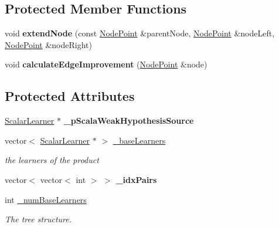 \subsection*{Protected Member Functions}
\begin{DoxyCompactItemize}
\item 
\hypertarget{classMultiBoost_1_1TreeLearner_ad763209e0f068124297f7b878209eda7}{
void {\bfseries extendNode} (const \hyperlink{structMultiBoost_1_1NodePoint}{NodePoint} \&parentNode, \hyperlink{structMultiBoost_1_1NodePoint}{NodePoint} \&nodeLeft, \hyperlink{structMultiBoost_1_1NodePoint}{NodePoint} \&nodeRight)}
\label{classMultiBoost_1_1TreeLearner_ad763209e0f068124297f7b878209eda7}

\item 
\hypertarget{classMultiBoost_1_1TreeLearner_a0971878fc92652e2f61fb5d4044c56c8}{
void {\bfseries calculateEdgeImprovement} (\hyperlink{structMultiBoost_1_1NodePoint}{NodePoint} \&node)}
\label{classMultiBoost_1_1TreeLearner_a0971878fc92652e2f61fb5d4044c56c8}

\end{DoxyCompactItemize}
\subsection*{Protected Attributes}
\begin{DoxyCompactItemize}
\item 
\hypertarget{classMultiBoost_1_1TreeLearner_a78720aad6ed0557a2233019d3e5ede49}{
\hyperlink{classMultiBoost_1_1ScalarLearner}{ScalarLearner} $\ast$ {\bfseries \_\-pScalaWeakHypothesisSource}}
\label{classMultiBoost_1_1TreeLearner_a78720aad6ed0557a2233019d3e5ede49}

\item 
\hypertarget{classMultiBoost_1_1TreeLearner_a79ec9f6c29efc369298e3f64ae62e026}{
vector$<$ \hyperlink{classMultiBoost_1_1ScalarLearner}{ScalarLearner} $\ast$ $>$ \hyperlink{classMultiBoost_1_1TreeLearner_a79ec9f6c29efc369298e3f64ae62e026}{\_\-baseLearners}}
\label{classMultiBoost_1_1TreeLearner_a79ec9f6c29efc369298e3f64ae62e026}

\begin{DoxyCompactList}\small\item\em the learners of the product \end{DoxyCompactList}\item 
\hypertarget{classMultiBoost_1_1TreeLearner_abff1d4f0933eefd6343043b4b6e82cfd}{
vector$<$ vector$<$ int $>$ $>$ {\bfseries \_\-idxPairs}}
\label{classMultiBoost_1_1TreeLearner_abff1d4f0933eefd6343043b4b6e82cfd}

\item 
\hypertarget{classMultiBoost_1_1TreeLearner_a2bdf0df64af916860d3a1aa762bfd2b6}{
int \hyperlink{classMultiBoost_1_1TreeLearner_a2bdf0df64af916860d3a1aa762bfd2b6}{\_\-numBaseLearners}}
\label{classMultiBoost_1_1TreeLearner_a2bdf0df64af916860d3a1aa762bfd2b6}

\begin{DoxyCompactList}\small\item\em The tree structure. \end{DoxyCompactList}\end{DoxyCompactItemize}


